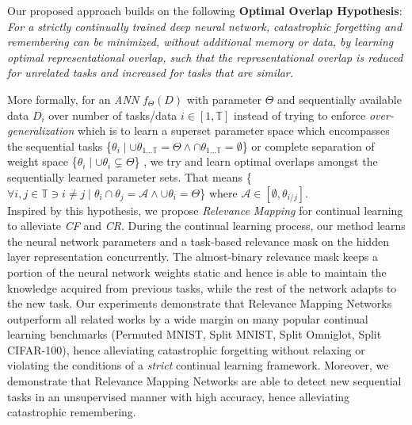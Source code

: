 \documentclass{article}
\begin{document}
Our proposed approach builds on the following \textbf{Optimal Overlap Hypothesis}:
 \textit{For a strictly continually trained deep neural network, 
catastrophic forgetting and remembering can be minimized, without additional memory or data, by learning optimal representational overlap, such that the representational overlap is reduced for unrelated tasks and increased for tasks that are similar.}\par
More formally, for an \textit{ANN} $f_{\Theta}(D)$ with parameter $\Theta$ and sequentially available data $D_i$ over number of tasks/data $i \in [ 1,\mathbb{T}]$ instead of trying to enforce \textit{over-generalization} which is to learn a superset parameter space which encompasses the sequential tasks \{$\theta_i\mid \cup\theta_{1...\mathbb{T}}=\Theta \wedge \cap \theta_{1... \mathbb{T}} = \emptyset$\} or complete separation of weight space \{$\theta_i\mid \cup\theta_i \subsetneq \Theta$\} 
, we try and learn optimal overlaps amongst the sequentially learned parameter sets. That means \{$\forall{i,j}\in \mathbb{T}\ni i \neq j \mid \theta_i \cap \theta_j = \mathcal{A} \wedge \cup\theta_i = \Theta$\} where $\mathcal{A}\in [\emptyset,\theta_{i/j}]$.\\
Inspired by this hypothesis, we propose \textit{Relevance Mapping} for continual learning to alleviate \textit{CF} and \textit{CR}. 
During the continual learning process, our method learns the neural network parameters and a task-based relevance mask on the hidden layer representation concurrently. The almost-binary relevance mask keeps a portion of the neural network weights static and hence is able to maintain the knowledge acquired from previous tasks, while the rest of the network adapts to the new task.
Our experiments demonstrate that Relevance Mapping Networks outperform all related works by a wide margin on many popular continual learning benchmarks (Permuted MNIST, Split MNIST, Split Omniglot, Split CIFAR-100), hence alleviating catastrophic forgetting without relaxing or violating the conditions of a \textit{strict} continual learning framework.
Moreover, we demonstrate that Relevance Mapping Networks are able to detect new sequential tasks in an unsupervised manner with high accuracy, hence alleviating catastrophic remembering.
\\
\end{document}
